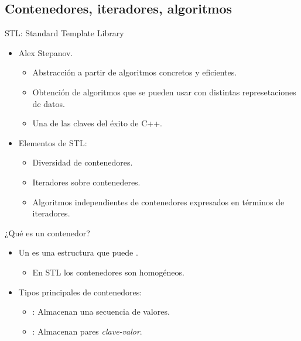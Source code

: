 \subsection{Contenedores, iteradores, algoritmos}

\begin{frame}[t]{STL: Standard Template Library}
\begin{itemize}
  \item Alex Stepanov.
    \begin{itemize}
      \item Abstracción a partir de algoritmos concretos y eficientes.
      \item Obtención de algoritmos que se pueden usar con distintas represetaciones
            de datos.
      \item Una de las claves del éxito de C++.
    \end{itemize}

  \vfill\pause
  \item Elementos de STL:
    \begin{itemize}
      \item Diversidad de contenedores.
      \item Iteradores sobre contenederes.
      \item Algoritmos independientes de contenedores expresados en
            términos de iteradores.
    \end{itemize}
\end{itemize}
\end{frame}

\begin{frame}[t,fragile]{¿Qué es un contenedor?}
\begin{itemize}
  \item Un  es una estructura que puede
        .
    \begin{itemize}
      \item En STL los contenedores son homogéneos.
    \end{itemize}

  \vfill\pause
  \item Tipos principales de contenedores:
    \begin{itemize}
      \item {}: Almacenan una secuencia de valores.
      \item {}: Almacenan pares \emph{clave-valor}.
    \end{itemize}
\end{itemize}
\end{frame}

